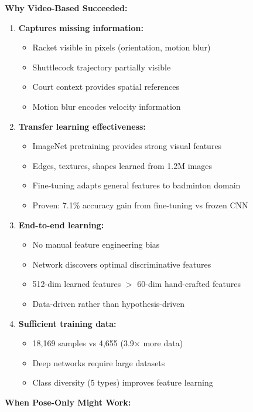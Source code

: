 \documentclass[11pt,a4paper]{article}
\begin{document}
\textbf{Why Video-Based Succeeded:}

\begin{enumerate}
\item \textbf{Captures missing information:}
   \begin{itemize}
   \item Racket visible in pixels (orientation, motion blur)
   \item Shuttlecock trajectory partially visible
   \item Court context provides spatial references
   \item Motion blur encodes velocity information
   \end{itemize}

\item \textbf{Transfer learning effectiveness:}
   \begin{itemize}
   \item ImageNet pretraining provides strong visual features
   \item Edges, textures, shapes learned from 1.2M images
   \item Fine-tuning adapts general features to badminton domain
   \item Proven: 7.1\% accuracy gain from fine-tuning vs frozen CNN
   \end{itemize}

\item \textbf{End-to-end learning:}
   \begin{itemize}
   \item No manual feature engineering bias
   \item Network discovers optimal discriminative features
   \item 512-dim learned features $>$ 60-dim hand-crafted features
   \item Data-driven rather than hypothesis-driven
   \end{itemize}

\item \textbf{Sufficient training data:}
   \begin{itemize}
   \item 18,169 samples vs 4,655 (3.9× more data)
   \item Deep networks require large datasets
   \item Class diversity (5 types) improves feature learning
   \end{itemize}
\end{enumerate}

\textbf{When Pose-Only Might Work:}
\end{document}

